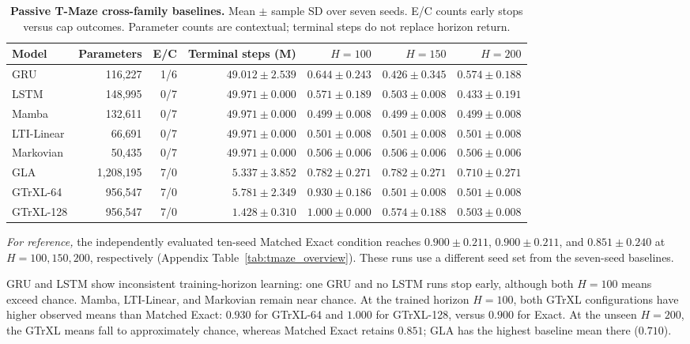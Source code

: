\begin{table}[t]
\centering\footnotesize
\setlength{\tabcolsep}{3.5pt}
\caption{\textbf{Passive T-Maze cross-family baselines.} Mean $\pm$ sample SD over seven seeds. E/C counts early stops versus cap outcomes. Parameter counts are contextual; terminal steps do not replace horizon return.}
\label{tab:tmaze_external_main}
\begin{tabular}{lrrrrrr}
\toprule
Model & Parameters & E/C & Terminal steps (M) & $H=100$ & $H=150$ & $H=200$ \\
\midrule
GRU         & 116,227   & 1/6 & $49.012\pm2.539$ & $0.644\pm0.243$ & $0.426\pm0.345$ & $0.574\pm0.188$ \\
LSTM        & 148,995   & 0/7 & $49.971\pm0.000$ & $0.571\pm0.189$ & $0.503\pm0.008$ & $0.433\pm0.191$ \\
Mamba       & 132,611   & 0/7 & $49.971\pm0.000$ & $0.499\pm0.008$ & $0.499\pm0.008$ & $0.499\pm0.008$ \\
LTI-Linear  &  66,691   & 0/7 & $49.971\pm0.000$ & $0.501\pm0.008$ & $0.501\pm0.008$ & $0.501\pm0.008$ \\
Markovian   &  50,435   & 0/7 & $49.971\pm0.000$ & $0.506\pm0.006$ & $0.506\pm0.006$ & $0.506\pm0.006$ \\
GLA         & 1,208,195 & 7/0 & $ 5.337\pm3.852$ & $0.782\pm0.271$ & $0.782\pm0.271$ & $0.710\pm0.271$ \\
GTrXL-64    &   956,547 & 7/0 & $ 5.781\pm2.349$ & $0.930\pm0.186$ & $0.501\pm0.008$ & $0.501\pm0.008$ \\
GTrXL-128   &   956,547 & 7/0 & $ 1.428\pm0.310$ & $1.000\pm0.000$ & $0.574\pm0.188$ & $0.503\pm0.008$ \\
\bottomrule
\end{tabular}
\par\smallskip\raggedright\footnotesize
\textit{For reference,} the independently evaluated ten-seed Matched Exact condition reaches $0.900\pm0.211$, $0.900\pm0.211$, and $0.851\pm0.240$ at $H=100,150,200$, respectively (Appendix Table~\ref{tab:tmaze_overview}). These runs use a different seed set from the seven-seed baselines.
\end{table}

GRU and LSTM show inconsistent training-horizon learning: one GRU and no LSTM runs stop early, although both $H=100$ means exceed chance. Mamba, LTI-Linear, and Markovian remain near chance. At the trained horizon $H=100$, both GTrXL configurations have higher observed means than Matched Exact: $0.930$ for GTrXL-64 and $1.000$ for GTrXL-128, versus $0.900$ for Exact. At the unseen $H=200$, the GTrXL means fall to approximately chance, whereas Matched Exact retains $0.851$; GLA has the highest baseline mean there ($0.710$).

